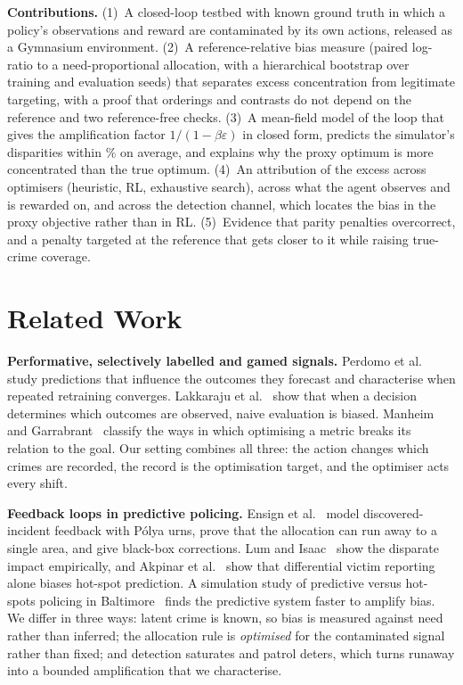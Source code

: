 \noindent\textbf{Contributions.}
(1)~A closed-loop testbed with known ground truth in which a policy's
observations and reward are contaminated by its own actions, released as a
Gymnasium environment.
(2)~A reference-relative bias measure (paired log-ratio to a need-proportional
allocation, with a hierarchical bootstrap over training and evaluation seeds)
that separates excess concentration from legitimate targeting, with a proof
that orderings and contrasts do not depend on the reference and two
reference-free checks.
(3)~A mean-field model of the loop that gives the amplification factor
$1/(1-\beta\varepsilon)$ in closed form, predicts the simulator's disparities
within \nThDispErr\% on average, and explains why the proxy optimum is more
concentrated than the true optimum.
(4)~An attribution of the excess across optimisers (heuristic, RL, exhaustive
search), across what the agent observes and is rewarded on, and across the
detection channel, which locates the bias in the proxy objective rather than in
RL.
(5)~Evidence that parity penalties overcorrect, and a penalty targeted at the
reference that gets closer to it while raising true-crime coverage.

\section{Related Work}

\textbf{Performative, selectively labelled and gamed signals.}
Perdomo et al.~\cite{perdomo2020} study predictions that influence the outcomes
they forecast and characterise when repeated retraining converges. Lakkaraju et
al.~\cite{lakkaraju2017} show that when a decision determines which outcomes are
observed, naive evaluation is biased. Manheim and
Garrabrant~\cite{manheim2018} classify the ways in which optimising a metric
breaks its relation to the goal. Our setting combines all three: the action
changes which crimes are recorded, the record is the optimisation target, and
the optimiser acts every shift.

\textbf{Feedback loops in predictive policing.}
Ensign et al.~\cite{ensign2018} model discovered-incident feedback with P\'olya
urns, prove that the allocation can run away to a single area, and give
black-box corrections. Lum and Isaac~\cite{lum2016} show the disparate impact
empirically, and Akpinar et al.~\cite{akpinar2021} show that differential
victim reporting alone biases hot-spot prediction. A simulation study of
predictive versus hot-spots policing in Baltimore~\cite{algorithms2026} finds
the predictive system faster to amplify bias. We differ in three ways: latent
crime is known, so bias is measured against need rather than inferred; the
allocation rule is \emph{optimised} for the contaminated signal rather than
fixed; and detection saturates and patrol deters, which turns runaway into a
bounded amplification that we characterise.

